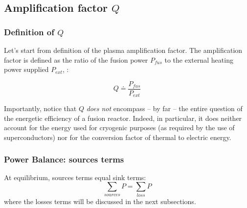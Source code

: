 \subsection{Amplification factor $Q$}


\subsubsection{Definition of $Q$}
Let's start from definition of the plasma amplification factor. The amplification factor is defined as the ratio of the fusion power $P_{fus}$ to the external heating power supplied $P_{ext}$\cite[p.12]{Wesson2004}, \cite[(3.4)]{FusionCEA1987}:

\begin{equation}
	Q \doteq \frac{P_{fus}}{P_{ext}}
\label{eq:definition_Q}
\end{equation}

Importantly, notice that $Q$ \emph{does not} encompass -- by far -- the entire question of the energetic efficiency of a fusion reactor. Indeed, in particular, it does neither account for the energy used for cryogenic purposes (as required by the use of superconductors) nor for the conversion factor of thermal to electric energy.

\subsubsection{Power Balance: sources terms}
At equilibrium, sources terms equal sink terms:
\begin{equation}
	\sum_{sources} P = \sum_{loss} P
	\label{eq:power_balance_general}
\end{equation}
where the losses terms will be discussed in the next subsections.

